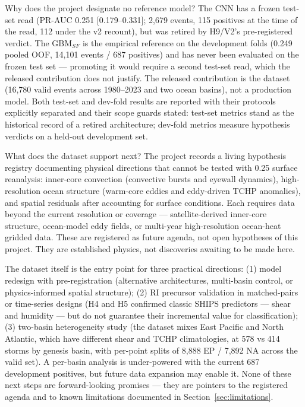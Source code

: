 \documentclass[11pt]{article}
\begin{document}
Why does the project designate no reference model? The CNN has a frozen
test-set read (PR-AUC 0.251 [0.179--0.331]; 2{,}679 events, 115 positives at
the time of the read, 112 under the v2 recount), but was retired by H9/V2's
pre-registered verdict. The GBM$_{SF}$ is the empirical reference on the
development folds (0.249 pooled OOF, 14{,}101 events / 687 positives) and has
never been evaluated on the frozen test set --- promoting it would require a
second test-set read, which the released contribution does not justify. The
released contribution is the dataset (16{,}780 valid events across 1980--2023
and two ocean basins), not a production model. Both test-set and dev-fold
results are reported with their protocols explicitly separated and their scope
guards stated: test-set metrics stand as the historical record of a retired
architecture; dev-fold metrics measure hypothesis verdicts on a held-out
development set.

What does the dataset support next? The project records a living hypothesis
registry documenting physical directions that cannot be tested with
0.25\textdegree{} surface reanalysis: inner-core convection (convective bursts
and eyewall dynamics), high-resolution ocean structure (warm-core eddies and
eddy-driven TCHP anomalies), and spatial residuals after accounting for surface
conditions. Each requires data beyond the current resolution or coverage ---
satellite-derived inner-core structure, ocean-model eddy fields, or multi-year
high-resolution ocean-heat gridded data. These are registered as future agenda,
not open hypotheses of this project. They are established physics, not
discoveries awaiting to be made here.

The dataset itself is the entry point for three practical directions: (1) model
redesign with pre-registration (alternative architectures, multi-basin control,
or physics-informed spatial structure); (2) RI precursor validation in
matched-pairs or time-series designs (H4 and H5 confirmed classic SHIPS
predictors --- shear and humidity --- but do not guarantee their incremental
value for classification); (3) two-basin heterogeneity study (the dataset mixes
East Pacific and North Atlantic, which have different shear and TCHP
climatologies, at 578 vs 414 storms by genesis basin, with per-point splits of
8{,}888 EP / 7{,}892 NA across the valid set). A per-basin analysis is
under-powered with the current 687 development positives, but future data
expansion may enable it. None of these next steps are forward-looking promises
--- they are pointers to the registered agenda and to known limitations
documented in Section~\ref{sec:limitations}.
\end{document}
